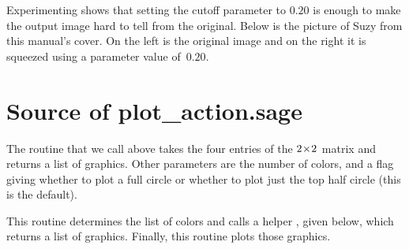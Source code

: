 Experimenting shows that setting
the cutoff parameter to $0.20$ is enough to make the output image hard to tell
from the original.
Below is the picture of Suzy 
from this manual's cover.
On the left is the original image
and on the right it is squeezed using a parameter value of~$0.20$.
\begin{center}
  \quad
\end{center}



\section{Source of plot\_action.sage}

The 
routine that we call above takes the four entries of the $2 \! \times \! 2$
matrix and returns a list of graphics.
Other parameters are the number of colors, and a flag giving whether
to plot a full circle or whether to plot just the top half circle (this
is the default).

This routine determines the list of colors and 
calls a helper , 
given below, which returns a list of graphics.
Finally, this routine plots those graphics.


